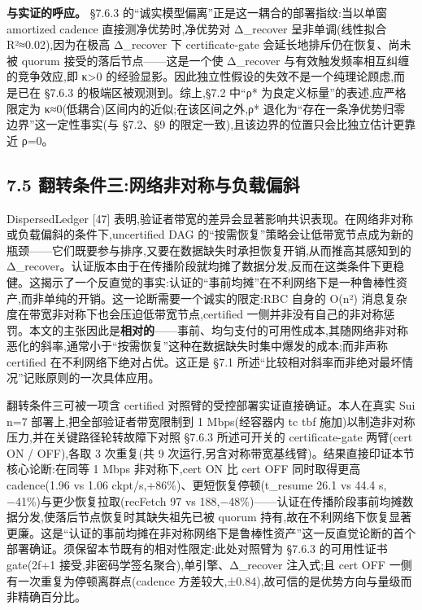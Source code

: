 \documentclass[UTF8,fontset=windows,a4paper,11pt]{ctexart}
\begin{document}
\textbf{与实证的呼应。} §7.6.3 的``诚实模型偏离''正是这一耦合的部署指纹:当以单窗
amortized cadence 直接测净优势时,净优势对 Δ\_recover
呈非单调(线性拟合 R²≈0.02),因为在极高 Δ\_recover 下 certificate-gate
会延长地排斥仍在恢复、尚未被 quorum
接受的落后节点------这是一个使 Δ\_recover
与有效触发频率相互纠缠的竞争效应,即 κ\textgreater0
的经验显影。因此独立性假设的失效不是一个纯理论顾虑,而是已在 §7.6.3
的极端区被观测到。综上,§7.2 中``ρ* 为良定义标量''的表述,应严格限定为
κ≈0(低耦合)区间内的近似;在该区间之外,ρ*
退化为``存在一条净优势归零边界''这一定性事实(与
§7.2、§9 的限定一致),且该边界的位置只会比独立估计更靠近 ρ=0。

\subsection{7.5
翻转条件三:网络非对称与负载偏斜}\label{ux7ffbux8f6cux6761ux4ef6ux4e09ux7f51ux7edcux975eux5bf9ux79f0ux4e0eux8d1fux8f7dux504fux659c}

DispersedLedger {[}47{]}
表明,验证者带宽的差异会显著影响共识表现。在网络非对称或负载偏斜的条件下,uncertified
DAG
的``按需恢复''策略会让低带宽节点成为新的瓶颈------它们既要参与排序,又要在数据缺失时承担恢复开销,从而推高其感知到的
Δ\_recover。认证版本由于在传播阶段就均摊了数据分发,反而在这类条件下更稳健。这揭示了一个反直觉的事实:认证的``事前均摊''在不利网络下是一种鲁棒性资产,而非单纯的开销。这一论断需要一个诚实的限定:RBC
自身的 O(n²) 消息复杂度在带宽非对称下也会压迫低带宽节点,certified
一侧并非没有自己的非对称惩罚。本文的主张因此是\textbf{相对的}------事前、均匀支付的可用性成本,其随网络非对称恶化的斜率,通常小于``按需恢复''这种在数据缺失时集中爆发的成本;而非声称
certified 在不利网络下绝对占优。这正是 §7.1
所述``比较相对斜率而非绝对最坏情况''记账原则的一次具体应用。

翻转条件三可被一项含 certified 对照臂的受控部署实证直接确证。本人在真实
Sui n=7 部署上,把全部验证者带宽限制到 1 Mbps(经容器内 tc tbf
施加)以制造非对称压力,并在关键路径轮转故障下对照 §7.6.3 所述可开关的
certificate-gate 两臂(cert ON / OFF),各取 3 次重复(共 9
次运行,另含对称带宽基线臂)。结果直接印证本节核心论断:在同等 1 Mbps
非对称下,cert ON 比 cert OFF 同时取得更高 cadence(1.96 vs 1.06
ckpt/s,+86\%)、更短恢复停顿(t\_resume 26.1 vs 44.4
s,−41\%)与更少恢复拉取(recFetch 97 vs
188,−48\%)------认证在传播阶段事前均摊数据分发,使落后节点恢复时其缺失祖先已被
quorum
持有,故在不利网络下恢复显著更廉。这是``认证的事前均摊在非对称网络下是鲁棒性资产''这一反直觉论断的首个部署确证。须保留本节既有的相对性限定:此处对照臂为
§7.6.3 的可用性证书 gate(2f+1 接受,非密码学签名聚合),单引擎、Δ\_recover
注入式;且 cert OFF 一侧有一次重复为停顿离群点(cadence
方差较大,±0.84),故可信的是优势方向与量级而非精确百分比。
\end{document}
